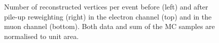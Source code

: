 \begin{figure}[!htpb]
\begin{center}
	\caption{\label{fig:pileup_vertices}
    Number of reconstructed vertices per event before (left) and after pile-up reweighting (right) in the electron
    channel (top) and in the muon channel (bottom). Both data and sum of the MC samples are normalised to unit area.}
\end{center}
\end{figure}

\begin{figure}[!htpb]
\begin{center}
	\hfill
	 \\
	\hfill

\end{center}
\end{figure}
